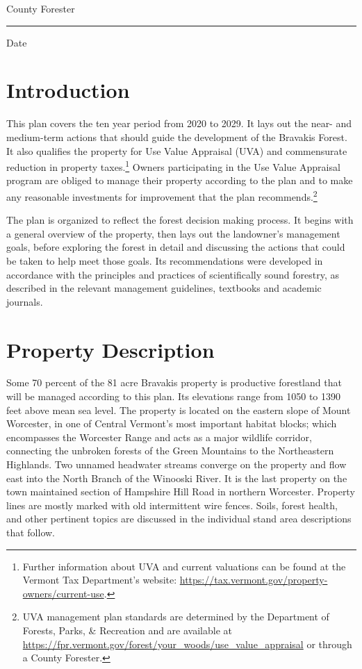 \documentclass[]{tufte-handout}
\begin{document}
\noindent County Forester \rule{5.3cm}{0pt} Date

\pagebreak

\section{Introduction}\label{introduction}

This plan covers the ten year period from 2020 to 2029. It lays out the
near- and medium-term actions that should guide the development of the
Bravakis Forest. It also qualifies the property for Use Value Appraisal
(UVA) and commensurate reduction in property taxes.\footnote{Further
  information about UVA and current valuations can be found at the
  Vermont Tax Department's website:
  \url{https://tax.vermont.gov/property-owners/current-use}.
  \vspace{20pt}} Owners participating in the Use Value Appraisal program
are obliged to manage their property according to the plan and to make
any reasonable investments for improvement that the plan
recommends.\footnote{UVA management plan standards are determined by the
  Department of Forests, Parks, \& Recreation and are available at
  \url{https://fpr.vermont.gov/forest/your_woods/use_value_appraisal} or
  through a County Forester.}

The plan is organized to reflect the forest decision making process. It
begins with a general overview of the property, then lays out the
landowner's management goals, before exploring the forest in detail and
discussing the actions that could be taken to help meet those goals. Its
recommendations were developed in accordance with the principles and
practices of scientifically sound forestry, as described in the relevant
management guidelines, textbooks and academic journals.

\section{Property Description}\label{property-description}

Some 70 percent of the 81 acre Bravakis property is productive
forestland that will be managed according to this plan. Its elevations
range from 1050 to 1390 feet above mean sea level. The property is
located on the eastern slope of Mount Worcester, in one of Central
Vermont's most important habitat blocks; which encompasses the Worcester
Range and acts as a major wildlife corridor, connecting the unbroken
forests of the Green Mountains to the Northeastern Highlands. Two
unnamed headwater streams converge on the property and flow east into
the North Branch of the Winooski River. It is the last property on the
town maintained section of Hampshire Hill Road in northern Worcester.
Property lines are mostly marked with old intermittent wire fences.
Soils, forest health, and other pertinent topics are discussed in the
individual stand area descriptions that follow.
\end{document}
